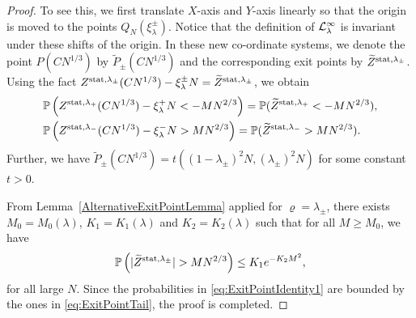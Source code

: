 \documentclass[12pt,a4paper]{article}
\numberwithin{equation}{section}
\newcommand{\Pb}{\mathbb{P}}
\begin{document}
\begin{proof}
To see this, we first translate $X$-axis and $Y$-axis linearly so that the origin is moved to the points $Q_N(\xi^{\pm}_{\lambda})$. Notice that the definition of ${\cal L}_{\lambda}^\infty$ is invariant under these shifts of the origin. In these new co-ordinate systems, we denote the point $P(CN^{1/3})$ by $\widetilde{P}_{\pm}(CN^{1/3})$ and the corresponding exit points by $\widetilde{Z}^{{\rm stat},\lambda_{\pm}}$. Using the fact $Z^{{\rm stat}, \lambda_\pm}(CN^{1/3}) - \xi^{\pm}_{\lambda} N=\widetilde{Z}^{{\rm stat},\lambda_{\pm}}$, we obtain
 \begin{equation}\label{eq:ExitPointIdentity1}
 \begin{aligned}
 &\Pb\left(Z^{{\rm stat},\lambda_{+}}(CN^{1/3}) - \xi^{+}_{\lambda} N< -M N^{2/3}\right)=\Pb(\widetilde{Z}^{{\rm stat},\lambda_{+}}<-MN^{2/3}),\\
 &\Pb\left(Z^{{\rm stat},\lambda_{-}}(CN^{1/3}) - \xi^{-}_{\lambda} N> M N^{2/3}\right)=\Pb(\widetilde{Z}^{{\rm stat},\lambda_{-}}>MN^{2/3}).
 \end{aligned}
 \end{equation}
Further, we have $\widetilde{P}_{\pm}(CN^{1/3})=t((1-\lambda_{\pm})^2 N, (\lambda_{\pm})^2 N)$ for some constant $t>0$.

From Lemma~\ref{AlternativeExitPointLemma} applied for $\varrho=\lambda_\pm$, there exists $M_0=M_0(\lambda)$, $K_1=K_1(\lambda)$ and $K_2=K_2(\lambda)$ such that for all $M\geq M_0$, we have
\begin{equation}
\Pb\left(|\widetilde{Z}^{{\rm stat},\lambda_{\pm}}|>MN^{2/3}\right)\leq K_1 e^{-K_2M^2},\label{eq:ExitPointTail}
\end{equation}
for all large $N$. Since the probabilities in \eqref{eq:ExitPointIdentity1} are bounded by the ones in \eqref{eq:ExitPointTail}, the proof is completed.
\end{proof}
\end{document}
